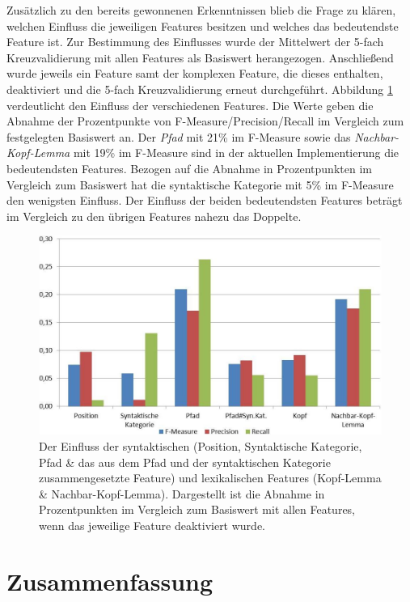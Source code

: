 \documentclass[12pt]{article}
\begin{document}
Zusätzlich zu den bereits gewonnenen Erkenntnissen blieb die Frage zu klären, welchen Einfluss die jeweiligen Features besitzen und welches das bedeutendste Feature ist. Zur Bestimmung des Einflusses wurde der Mittelwert der 5-fach Kreuzvalidierung mit allen Features als Basiswert herangezogen. Anschließend wurde jeweils ein Feature samt der komplexen Feature, die dieses enthalten, deaktiviert und die 5-fach Kreuzvalidierung erneut durchgeführt. Abbildung \ref{featureImpact} verdeutlicht den Einfluss der verschiedenen Features. Die Werte geben die Abnahme der Prozentpunkte von F-Measure/Precision/Recall im Vergleich zum festgelegten Basiswert an.
Der \textit{Pfad} mit 21\% im F-Measure sowie das \textit{Nachbar-Kopf-Lemma} mit 19\% im F-Measure sind in der aktuellen Implementierung die bedeutendsten Features. Bezogen auf die Abnahme in Prozentpunkten im Vergleich zum Basiswert hat die syntaktische Kategorie mit 5\% im F-Measure den wenigsten Einfluss. Der Einfluss der beiden bedeutendsten Features beträgt im Vergleich zu den übrigen Features nahezu das Doppelte.

	\begin{figure}[tb!]
		\centering		
		\includegraphics[scale=0.9]{images/featureImpact_sorted.jpg}
		\caption[Einfluss der genutzten Features]{Der Einfluss der syntaktischen (Position, Syntaktische Kategorie, Pfad \& das aus dem Pfad und der syntaktischen Kategorie zusammengesetzte Feature) und lexikalischen Features (Kopf-Lemma \& Nachbar-Kopf-Lemma). Dargestellt ist die Abnahme in Prozentpunkten im Vergleich zum Basiswert mit allen Features, wenn das jeweilige Feature deaktiviert wurde.}
		\label{featureImpact}
	\end{figure}

\FloatBarrier
\newpage
\section{Zusammenfassung}
\end{document}
